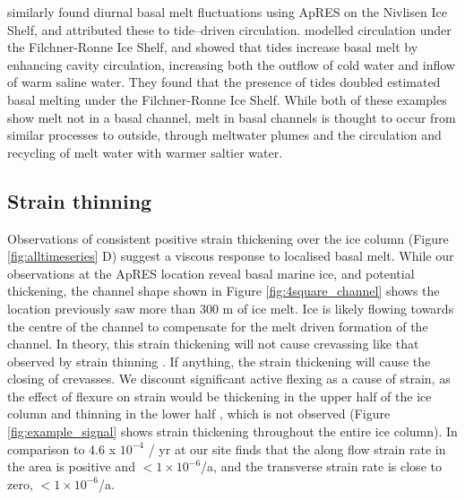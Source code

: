 \cite{lindback2019spatial} similarly found diurnal basal melt fluctuations using ApRES on the Nivlisen Ice Shelf, and attributed these to tide--driven circulation.
\cite{makinson2011influence} modelled circulation under the Filchner-Ronne Ice Shelf, and showed that tides increase basal melt by enhancing cavity circulation, increasing both the outflow of cold water and inflow of warm saline water. They found that the presence of tides doubled estimated basal melting under the Filchner-Ronne Ice Shelf. While both of these examples show melt not in a basal channel, melt in basal channels is thought to occur from similar processes to outside, through meltwater plumes \citep{sergienko2013basal} and the circulation and recycling of melt water with warmer saltier water.
 
 
  
\subsection{Strain thinning} 
 
Observations of consistent positive strain thickening over the ice column (Figure \ref{fig:alltimeseries} D) suggest a viscous response to localised basal melt.  While our observations at the ApRES location reveal basal marine ice, and potential thickening, the channel shape shown in Figure \ref{fig:4square_channel} shows the location previously saw more than 300 m of ice  melt. Ice is likely flowing towards the centre of the channel to compensate for the melt driven formation of the channel.
In theory, this strain thickening will not cause crevassing like that observed by strain thinning \citep[e.g.][]{vaughan2012subglacial}. If anything, the strain thickening will cause the closing of crevasses.
We discount significant active flexing as a cause of strain, as the effect of flexure on strain would be thickening in the upper half of the ice column and  thinning in the lower half \citep{vaughan2012subglacial}, which is not observed (Figure \ref{fig:example_signal} shows strain thickening throughout the entire ice column).
In comparison to 4.6 x $10^{-4}$ / yr at our site \cite{alley2018continent} finds that the along flow strain rate in the area is positive and $< 1 \times 10 ^{-6}$/a, and the transverse strain rate is close to zero, $< 1 \times 10 ^{-6}$/a.

